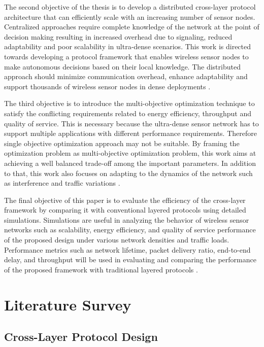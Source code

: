 \documentclass[a4paper,fleqn]{cas-dc}
\numberwithin{equation}{section}
\begin{document}
The second objective of the thesis is to develop a distributed cross-layer protocol architecture that can efficiently scale with an increasing number of sensor nodes. Centralized approaches require complete knowledge of the network at the point of decision making resulting in increased overhead due to signaling, reduced adaptability and poor scalability in ultra-dense scenarios. This work is directed towards developing a protocol framework that enables wireless sensor nodes to make autonomous decisions based on their local knowledge. The distributed approach should minimize communication overhead, enhance adaptability and support thousands of wireless sensor nodes in dense deployments \cite{Khamzaev2025498}.

The third objective is to introduce the multi-objective optimization technique to satisfy the conflicting requirements related to energy efficiency, throughput and quality of service. This is necessary because the ultra-dense sensor network has to support multiple applications with different performance requirements. Therefore single objective optimization approach may not be suitable. By framing the optimization problem as multi-objective optimization problem, this work aims at achieving a well balanced trade-off among the important parameters. In addition to that, this work also focuses on adapting to the dynamics of the network such as interference and traffic variations \cite{He2025157}.

The final objective of this paper is to evaluate the efficiency of the cross-layer framework by comparing it with conventional layered protocols using detailed simulations. Simulations are useful in analyzing the behavior of wireless sensor networks such as scalability, energy efficiency, and quality of service performance of the proposed design under various network densities and traffic loads. Performance metrics such as network lifetime, packet delivery ratio, end-to-end delay, and throughput will be used in evaluating and comparing the performance of the proposed framework with traditional layered protocols \cite{Xu2023}.

\section{Literature Survey}

\subsection{Cross-Layer Protocol Design}
\end{document}
